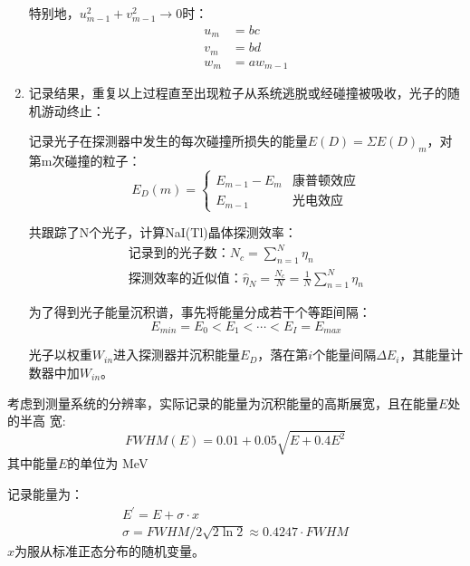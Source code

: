 \documentclass{article}
\begin{document}
\begin{enumerate}[label=\Alph*.]
    特别地，$u_{m-1}^2+v_{m-1}^2\to0$时：
    \begin{equation}
        \begin{aligned}u_m&=bc\\v_m&=bd\\w_m&=aw_{m-1}\end{aligned}
    \end{equation}
    \item 记录结果，重复以上过程直至出现粒子从系统逃脱或经碰撞被吸收，光子的随机游动终止：

    记录光子在探测器中发生的每次碰撞所损失的能量$E(D)=\Sigma E(D)_m$，对第m次碰撞的粒子：
    \begin{equation}
        E_D(m)=
        \begin{cases}
            E_{m-1}-E_m&\text{康普顿效应}\\
            E_{m-1}&\text{光电效应}
        \end{cases}
    \end{equation}

    共跟踪了N个光子，计算NaI(Tl)晶体探测效率：
    \begin{equation}
        \begin{gathered}
            \text{记录到的光子数：}N_c=\sum_{n=1}^N\eta_n\\
            \text{探测效率的近似值：}\hat{\eta}_N=\frac{N_c}{N}=\frac{1}{N}\sum_{n=1}^N\eta_n
        \end{gathered}
    \end{equation}

    为了得到光子能量沉积谱，事先将能量分成若干个等距间隔：
    \begin{equation}
        E_{min}=E_0<E_1<\cdots<E_I=E_{max}
    \end{equation}


    光子以权重$W_{in}$进入探测器并沉积能量$E_D$，落在第$i$个能量间隔$\Delta E_i$，其能量计数器中加$W_{in}$。
\end{enumerate}



考虑到测量系统的分辨率，实际记录的能量为沉积能量的高斯展宽，且在能量$E$处的半高
宽:
\begin{equation}
    FWHM(E)=0.01+0.05\sqrt{E+0.4E^2}
\end{equation}
其中能量$E$的单位为 MeV

记录能量为：
\begin{equation}
    \begin{gathered}
    E^{\prime }= E+ \sigma \cdot x\\
    \sigma = FWHM/ 2\sqrt {2\ln 2}\approx 0. 4247\cdot FWHM 
    \end{gathered}
\end{equation}
$x$为服从标准正态分布的随机变量。
\end{document}
